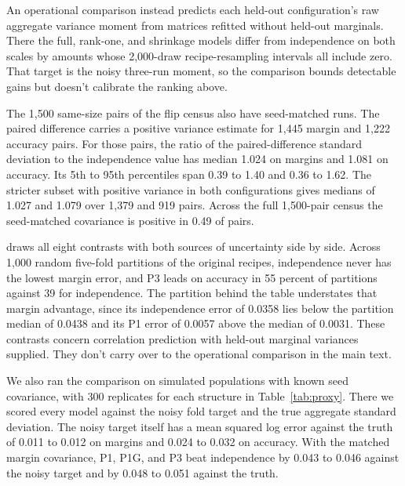 An operational comparison instead predicts each held-out configuration's raw aggregate variance moment from matrices refitted without held-out marginals. There the full, rank-one, and shrinkage models differ from independence on both scales by amounts whose 2,000-draw recipe-resampling intervals all include zero. That target is the noisy three-run moment, so the comparison bounds detectable gains but doesn't calibrate the ranking above.

The 1,500 same-size pairs of the flip census also have seed-matched runs. The paired difference carries a positive variance estimate for 1,445 margin and 1,222 accuracy pairs. For those pairs, the ratio of the paired-difference standard deviation to the independence value has median 1.024 on margins and 1.081 on accuracy. Its 5th to 95th percentiles span 0.39 to 1.40 and 0.36 to 1.62. The stricter subset with positive variance in both configurations gives medians of 1.027 and 1.079 over 1,379 and 919 pairs. Across the full 1,500-pair census the seed-matched covariance is positive in 0.49 of pairs.

 draws all eight contrasts with both sources of uncertainty side by side. Across 1,000 random five-fold partitions of the original recipes, independence never has the lowest margin error, and P3 leads on accuracy in 55 percent of partitions against 39 for independence. The partition behind the table understates that margin advantage, since its independence error of 0.0358 lies below the partition median of 0.0438 and its P1 error of 0.0057 above the median of 0.0031. These contrasts concern correlation prediction with held-out marginal variances supplied. They don't carry over to the operational comparison in the main text.

We also ran the comparison on simulated populations with known seed covariance, with 300 replicates for each structure in Table~\ref{tab:proxy}. There we scored every model against the noisy fold target and the true aggregate standard deviation. The noisy target itself has a mean squared log error against the truth of 0.011 to 0.012 on margins and 0.024 to 0.032 on accuracy. With the matched margin covariance, P1, P1G, and P3 beat independence by 0.043 to 0.046 against the noisy target and by 0.048 to 0.051 against the truth.

